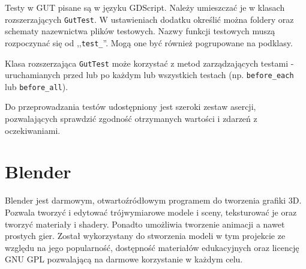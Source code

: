 Testy w GUT pisane są w języku GDScript. Należy umieszczać je w klasach rozszerzających \texttt{GutTest}. W ustawieniach dodatku określić można foldery oraz schematy nazewnictwa plików testowych. Nazwy funkcji testowych muszą rozpoczynać się od ,,\texttt{test\_}''. Mogą one być również pogrupowane na podklasy. 

Klasa rozszerzająca \texttt{GutTest} może korzystać z metod zarządzających testami - uruchamianych przed lub po każdym lub wszystkich testach (np. \texttt{before\_each} lub \texttt{before\_all}).

Do przeprowadzania testów udostępniony jest szeroki zestaw asercji, pozwalających sprawdzić zgodność otrzymanych wartości i zdarzeń z oczekiwaniami.


\section{Blender}
Blender jest darmowym, otwartoźródłowym programem do tworzenia grafiki 3D\cite{blender_page}\cite{mastering_blender}. Pozwala tworzyć i edytować trójwymiarowe modele i sceny, teksturować je oraz tworzyć materiały i shadery. Ponadto umożliwia tworzenie animacji a nawet prostych gier. Został wykorzystany do stworzenia modeli w tym projekcie ze względu na jego popularność, dostępność materiałów edukacyjnych oraz licencję GNU GPL pozwalającą na darmowe korzystanie w każdym celu.